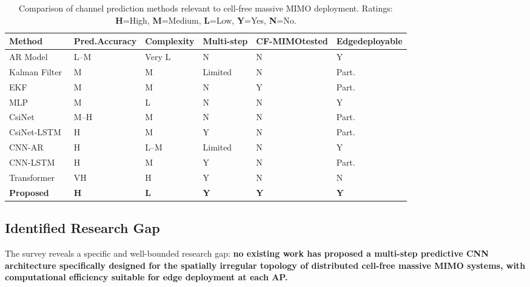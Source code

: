 \documentclass[12pt,a4paper]{article}
\begin{document}
\begin{table}[htbp]
  \centering
  \caption{Comparison of channel prediction methods relevant to
  cell-free massive MIMO deployment. Ratings: \textbf{H}=High,
  \textbf{M}=Medium, \textbf{L}=Low, \textbf{Y}=Yes, \textbf{N}=No.}
  \label{tab:comparison}
  \renewcommand{\arraystretch}{1.3}
  \begin{tabular}{
    >{\raggedright\arraybackslash}p{3.3cm}
    >{\centering\arraybackslash}p{1.5cm}
    >{\centering\arraybackslash}p{1.5cm}
    >{\centering\arraybackslash}p{1.6cm}
    >{\centering\arraybackslash}p{1.8cm}
    >{\centering\arraybackslash}p{1.8cm}
  }
    \toprule
    \textbf{Method} &
    \textbf{Pred.\newline Accuracy} &
    \textbf{Complexity} &
    \textbf{Multi-step} &
    \textbf{CF-MIMO\newline tested} &
    \textbf{Edge\newline deployable} \\
    \midrule
    AR Model                & L--M & Very L  & N       & N   & Y \\
    Kalman Filter           & M    & M       & Limited & N   & Part. \\
    EKF~\cite{Freitas2025ekf} & M  & M       & N       & Y   & Part. \\
    MLP                     & M    & L       & N       & N   & Y \\
    CsiNet~\cite{Wen2018csinet} & M--H & M   & N       & N   & Part. \\
    CsiNet-LSTM~\cite{Wang2019csinetlstm} & H & M & Y  & N   & Part. \\
    CNN-AR~\cite{Kim2021kalman} & H & L--M   & Limited & N   & Y \\
    CNN-LSTM~\cite{Nguyen2023cnnlstm} & H & M & Y     & N   & Part. \\
    Transformer~\cite{Jiang2022transformer} & VH & H & Y & N & N \\
    \midrule
    \textbf{Proposed}       & \textbf{H} & \textbf{L} & \textbf{Y} & \textbf{Y} & \textbf{Y} \\
    \bottomrule
  \end{tabular}
\end{table}

\subsection{Identified Research Gap}

The survey reveals a specific and well-bounded research gap:
\textbf{no existing work has proposed a multi-step predictive CNN
architecture specifically designed for the spatially irregular topology
of distributed cell-free massive MIMO systems, with computational
efficiency suitable for edge deployment at each AP.}
\end{document}
